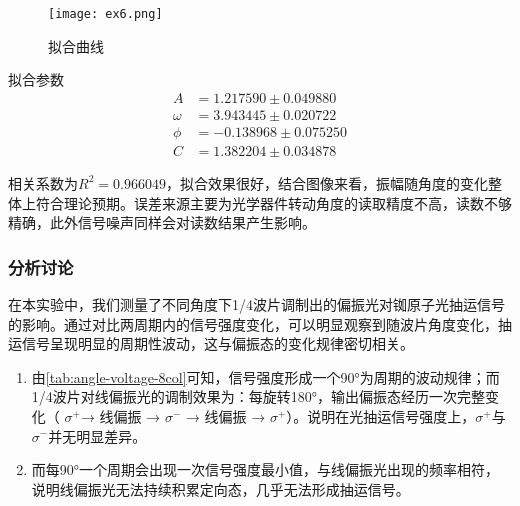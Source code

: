 \begin{figure}[{H}]
    \centering
    \texttt{[image: ex6.png]}
    \caption{拟合曲线}
    \label{}
\end{figure}

拟合参数
\begin{align*}
    A &= 1.217590 \pm 0.049880 \\
    \omega &= 3.943445 \pm 0.020722 \\
    \phi &= -0.138968 \pm 0.075250 \\
    C &= 1.382204 \pm 0.034878
\end{align*}




相关系数为$R^2 = 0.966049$，拟合效果很好，结合图像来看，振幅随角度的变化整体上符合理论预期。误差来源主要为光学器件转动角度的读取精度不高，读数不够精确，此外信号噪声同样会对读数结果产生影响。



\subsubsection{分析讨论}

    在本实验中，我们测量了不同角度下1/4波片调制出的偏振光对铷原子光抽运信号的影响。通过对比两周期内的信号强度变化，可以明显观察到随波片角度变化，抽运信号呈现明显的周期性波动，这与偏振态的变化规律密切相关。

    \begin{enumerate}
        \item 由\cref{tab:angle-voltage-8col}可知，信号强度形成一个90°为周期的波动规律；而1/4波片对线偏振光的调制效果为：每旋转180°，输出偏振态经历一次完整变化（ $\sigma^+$→ 线偏振 → $\sigma^-$ → 线偏振 → $\sigma^+$）。说明在光抽运信号强度上，$\sigma^+$与$\sigma^-$并无明显差异。
        
        \item 而每90°一个周期会出现一次信号强度最小值，与线偏振光出现的频率相符，说明线偏振光无法持续积累定向态，几乎无法形成抽运信号。
    \end{enumerate}


